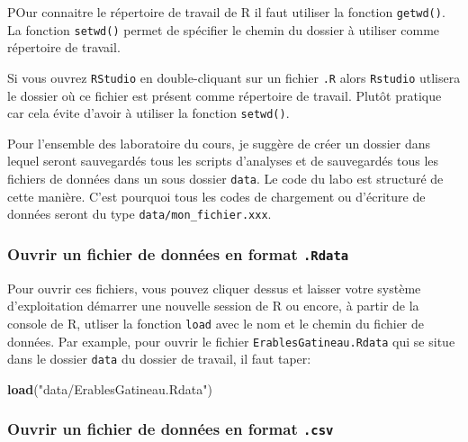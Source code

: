 \documentclass[
  12pt,
]{book}
\makeatletter
\newenvironment{Shaded}{\begin{snugshade}}{\end{snugshade}}
\newcommand{\KeywordTok}[1]{\textcolor[rgb]{0.13,0.29,0.53}{\textbf{#1}}}
\newcommand{\NormalTok}[1]{#1}
\newcommand{\StringTok}[1]{\textcolor[rgb]{0.31,0.60,0.02}{#1}}
\newenvironment{kframe}{%
\medskip{}
\setlength{\fboxsep}{.8em}
\def\at@end@of@kframe{}%
\ifinner\ifhmode%
 \def\at@end@of@kframe{\end{minipage}}%
 \begin{minipage}{\columnwidth}%
\fi\fi%
\def\FrameCommand##1{\hskip\@totalleftmargin \hskip-\fboxsep
\colorbox{incolor}{##1}\hskip-\fboxsep
    \hskip-\linewidth \hskip-\@totalleftmargin \hskip\columnwidth}%
\MakeFramed {\advance\hsize-\width
  \@totalleftmargin\z@ \linewidth\hsize
  \@setminipage}}%
{\par\unskip\endMakeFramed%
\at@end@of@kframe}
\newenvironment{rmdblock}[1]
 {
 \begin{itemize}
 \renewcommand{\labelitemi}{
   \raisebox{-.7\height}[0pt][0pt]{
     {\setkeys{Gin}{width=3em,keepaspectratio}\texttt{[image: images/\#1]}}
   }
 }
 \begin{kframe}
 \setlength{\fboxsep}{1em}
 \item
 }
 {
 \end{kframe}
 \end{itemize}
 }
\newenvironment{rmdimportant}
  {\begin{rmdblock}{important}}
  {\end{rmdblock}}
\newenvironment{rmdtip}
  {\begin{rmdblock}{tip}}
  {\end{rmdblock}}
\makeatother
\begin{document}
POur connaitre le répertoire de travail de R il faut utiliser la fonction \texttt{getwd()}. La fonction \texttt{setwd()} permet de spécifier le chemin du dossier à utiliser comme répertoire de travail.

\begin{rmdtip}
Si vous ouvrez \texttt{RStudio} en double-cliquant sur un fichier \texttt{.R} alors \texttt{Rstudio} utlisera le dossier où ce fichier est présent comme répertoire de travail. Plutôt pratique car cela évite d'avoir à utiliser la fonction \texttt{setwd()}.
\end{rmdtip}

\begin{rmdimportant}
Pour l'ensemble des laboratoire du cours, je suggère de créer un dossier dans lequel seront sauvegardés tous les scripts d'analyses et de sauvegardés tous les fichiers de données dans un sous dossier \texttt{data}. Le code du labo est structuré de cette manière. C'est pourquoi tous les codes de chargement ou d'écriture de données seront du type \texttt{data/mon\_fichier.xxx}.
\end{rmdimportant}

\hypertarget{ouvrir-un-fichier-de-donnuxe9es-en-format-.rdata}{%
\subsubsection{\texorpdfstring{Ouvrir un fichier de données en format \texttt{.Rdata}}{Ouvrir un fichier de données en format .Rdata}}\label{ouvrir-un-fichier-de-donnuxe9es-en-format-.rdata}}

Pour ouvrir ces fichiers, vous pouvez cliquer dessus et laisser votre système d'exploitation démarrer une nouvelle session de R ou encore, à partir de la console de R, utliser la fonction \texttt{load} avec le nom et le chemin du fichier de données.
Par example, pour ouvrir le fichier \texttt{ErablesGatineau.Rdata} qui se situe dans le dossier \texttt{data} du dossier de travail, il faut taper:

\begin{Shaded}
\begin{Highlighting}[]
\KeywordTok{load}\NormalTok{(}\StringTok{"data/ErablesGatineau.Rdata"}\NormalTok{)}
\end{Highlighting}
\end{Shaded}

\hypertarget{ouvrir-un-fichier-de-donnuxe9es-en-format-.csv}{%
\subsubsection{\texorpdfstring{Ouvrir un fichier de données en format \texttt{.csv}}{Ouvrir un fichier de données en format .csv}}\label{ouvrir-un-fichier-de-donnuxe9es-en-format-.csv}}
\end{document}
